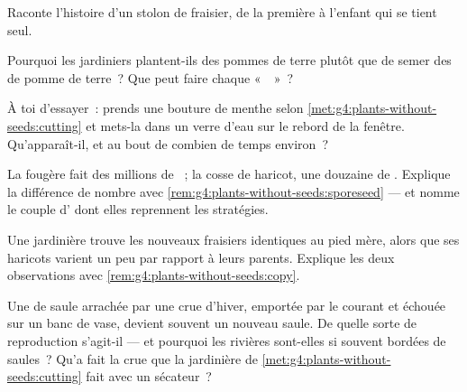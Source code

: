 \begin{exercise}[$\star$]\label{exo:g4:plants-without-seeds:6}
Raconte l'histoire d'un stolon de fraisier, de la première  à
l'enfant qui se tient seul.
\end{exercise}

\begin{exercise}[$\star$]\label{exo:g4:plants-without-seeds:7}
Pourquoi les jardiniers plantent-ils des pommes de terre plutôt que
de semer des  de pomme de terre~? Que peut faire chaque
«~~»~?
\end{exercise}

\begin{exercise}[$\star$]\label{exo:g4:plants-without-seeds:8}
À toi d'essayer~: prends une bouture de menthe selon
\cref{met:g4:plants-without-seeds:cutting} et mets-la dans un verre
d'eau sur le rebord de la fenêtre. Qu'apparaît-il, et au bout de
combien de temps environ~?
\end{exercise}

\begin{exercise}[$\star\star$]\label{exo:g4:plants-without-seeds:9}
La fougère fait des millions de ~; la cosse de haricot, une
douzaine de . Explique la différence de nombre avec
\cref{rem:g4:plants-without-seeds:sporeseed} --- et nomme le couple
d' dont elles reprennent les stratégies.
\end{exercise}

\begin{exercise}[$\star\star$]\label{exo:g4:plants-without-seeds:10}
Une jardinière trouve les nouveaux fraisiers identiques au pied
mère, alors que ses haricots varient un peu par rapport à leurs
parents. Explique les deux observations avec
\cref{rem:g4:plants-without-seeds:copy}.
\end{exercise}

\begin{exercise}[$\star\star\star$]\label{exo:g4:plants-without-seeds:11}
Une  de saule arrachée par une crue d'hiver, emportée par le
courant et échouée sur un banc de vase, devient souvent un nouveau
saule. De quelle sorte de reproduction s'agit-il --- et pourquoi les
rivières sont-elles si souvent bordées de saules~? Qu'a fait la crue
que la jardinière de
\cref{met:g4:plants-without-seeds:cutting} fait avec un sécateur~?
\end{exercise}
